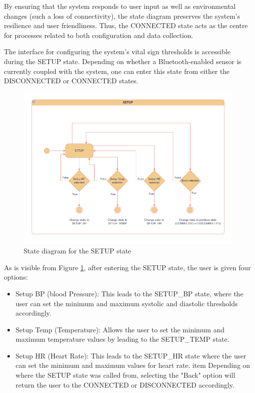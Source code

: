 By ensuring that the system responds to user input as well as environmental changes (such a loss of connectivity), the state diagram preserves the system's resilience and user friendliness. Thus, the CONNECTED state acts as the centre for processes related to both configuration and data collection.

The interface for configuring the system's vital sign thresholds is accessible during the SETUP state. Depending on whether a Bluetooth-enabled sensor is currently coupled with the system, one can enter this state from either the DISCONNECTED or CONNECTED states.

\begin{figure}[H]
	\centering
	\includegraphics[width=\textwidth]{diagrams/states_setup}
	\caption{State diagram for the SETUP state}
	\label{fig:states_setup}
\end{figure}

As is visible from Figure \ref{fig:states_setup}, after entering the SETUP state, the user is given four options:

\begin{itemize}
	\item Setup BP (blood Pressure): This leads to the SETUP\_BP state, where the user can set the minimum and maximum systolic and diastolic thresholds accordingly.
	\item Setup Temp (Temperature): Allows the user to set the minimum and maximum temperature values by leading to the SETUP\_TEMP state.
	\item Setup HR (Heart Rate): This leads to the SETUP\_HR state where the user can set the minimum and maximum values for heart rate.
	item Depending on where the SETUP state was called from, selecting the "Back" option will return the user to the CONNECTED or DISCONNECTED accordingly.
\end{itemize}


